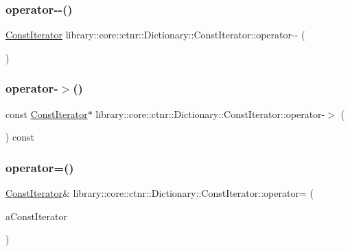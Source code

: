\subsubsection{\texorpdfstring{operator-\/-\/()}{operator--()}\hspace{0.1cm}{\footnotesize\ttfamily [2/2]}}
{\footnotesize\ttfamily \hyperlink{classlibrary_1_1core_1_1ctnr_1_1Dictionary_1_1ConstIterator}{Const\+Iterator} library\+::core\+::ctnr\+::\+Dictionary\+::\+Const\+Iterator\+::operator-\/-\/ (\begin{DoxyParamCaption}\item[{int}]{ }\end{DoxyParamCaption})}

\mbox{\label{classlibrary_1_1core_1_1ctnr_1_1Dictionary_1_1ConstIterator_a244e67b390e9dfab32beb9322e639be1}} 
\subsubsection{\texorpdfstring{operator-\/$>$()}{operator->()}}
{\footnotesize\ttfamily const \hyperlink{classlibrary_1_1core_1_1ctnr_1_1Dictionary_1_1ConstIterator}{Const\+Iterator}$\ast$ library\+::core\+::ctnr\+::\+Dictionary\+::\+Const\+Iterator\+::operator-\/$>$ (\begin{DoxyParamCaption}{ }\end{DoxyParamCaption}) const}

\mbox{\label{classlibrary_1_1core_1_1ctnr_1_1Dictionary_1_1ConstIterator_abb2ceb48b8d53f356fc951952f8e8f32}} 
\subsubsection{\texorpdfstring{operator=()}{operator=()}}
{\footnotesize\ttfamily \hyperlink{classlibrary_1_1core_1_1ctnr_1_1Dictionary_1_1ConstIterator}{Const\+Iterator}\& library\+::core\+::ctnr\+::\+Dictionary\+::\+Const\+Iterator\+::operator= (\begin{DoxyParamCaption}\item[{const \hyperlink{classlibrary_1_1core_1_1ctnr_1_1Dictionary_1_1ConstIterator}{Const\+Iterator} \&}]{a\+Const\+Iterator }\end{DoxyParamCaption})}

